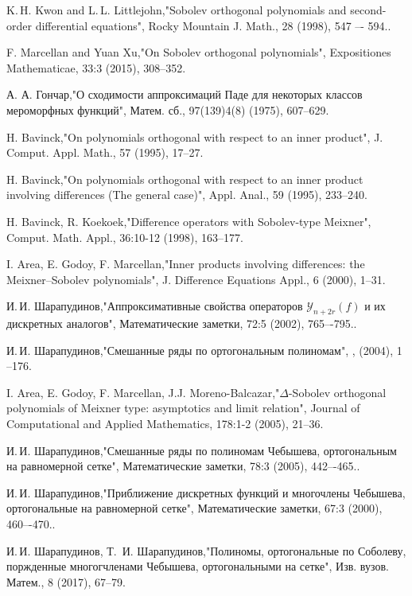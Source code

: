 \begin{thebibliography}{20}
K.\,H. Kwon and L.\,L. Littlejohn,"Sobolev orthogonal polynomials and second-order differential equations", Rocky Mountain J. Math., 28 (1998), 547 –- 594..


F. Marcellan and Yuan Xu,"On Sobolev orthogonal polynomials", Expositiones Mathematicae, 33:3 (2015), 308--352.


А. А. Гончар,"О сходимости аппроксимаций Паде для некоторых классов мероморфных функций", Матем. сб., 97(139)4(8) (1975), 607–629.


H. Bavinck,"On polynomials orthogonal with respect to an inner product", J. Comput. Appl. Math., 57 (1995), 17--27.


H. Bavinck,"On polynomials orthogonal with respect to an inner product involving differences (The general case)", Appl. Anal., 59 (1995), 233--240.


H. Bavinck, R. Koekoek,"Difference operators with Sobolev-type Meixner", Comput. Math. Appl., 36:10-12 (1998), 163--177.


I. Area, E. Godoy, F. Marcellan,"Inner products involving differences: the Meixner--Sobolev polynomials", J. Difference Equations Appl., 6 (2000), 1--31.


И.\,И. Шарапудинов,"Аппроксимативные свойства операторов $\mathcal{Y}_{n+2r}(f)$ и их дискретных аналогов", Математические заметки, 72:5 (2002), 765–-795..


И.\,И. Шарапудинов,"Смешанные ряды по ортогональным полиномам", ,  (2004), 1 --176.


I. Area, E. Godoy, F. Marcellan, J.J. Moreno-Balcazar,"$\Delta$-Sobolev orthogonal polynomials of Meixner type: asymptotics and limit relation", Journal of Computational and Applied Mathematics, 178:1-2 (2005), 21--36.


И.\,И. Шарапудинов,"Смешанные ряды по полиномам Чебышева, ортогональным на равномерной сетке", Математические заметки, 78:3 (2005), 442–-465..


И.\,И. Шарапудинов,"Приближение дискретных функций и многочлены Чебышева, ортогональные на равномерной сетке", Математические заметки, 67:3 (2000), 460–-470..


И.\,И. Шарапудинов, Т.\, И. Шарапудинов,"Полиномы, ортогональные по Соболеву, поржденные многогчленами Чебышева, ортогональными на сетке", Изв. вузов. Матем., 8 (2017), 67--79.



\end{thebibliography}
